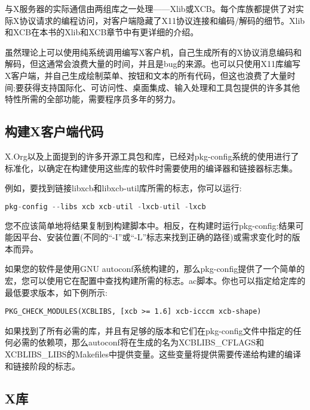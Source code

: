 与X服务器的实际通信由两组库之一处理——Xlib或XCB。每个库族都提供了对实际X协议请求的编程访问，对客户端隐藏了X11协议连接和编码/解码的细节。Xlib和XCB在本书的Xlib和XCB章节中有更详细的介绍。

虽然理论上可以使用纯系统调用编写X客户机，自己生成所有的X协议消息编码和解码，但这通常会浪费大量的时间，并且是bug的来源。也可以只使用X11库编写X客户端，并自己生成绘制菜单、按钮和文本的所有代码，但这也浪费了大量时间;要获得支持国际化、可访问性、桌面集成、输入处理和工具包提供的许多其他特性所需的全部功能，需要程序员多年的努力。

\subsection{构建X客户端代码}

X.Org以及上面提到的许多开源工具包和库，已经对pkg-config系统的使用进行了标准化，以确定在构建使用这些库的软件时需要使用的编译器和链接器标志集。

\noindent 例如，要找到链接libxcb和libxcb-util库所需的标志，你可以运行:

\begin{lstlisting}[language=C]
pkg-config --libs xcb xcb-util -lxcb-util -lxcb
\end{lstlisting}

\vspace{-2em}

您不应该简单地将结果复制到构建脚本中。相反，在构建时运行pkg-config:结果可能因平台、安装位置(不同的“-I”或“-L”标志来找到正确的路径)或需求变化时的版本而异。

\noindent 如果您的软件是使用GNU autoconf系统构建的，那么pkg-config提供了一个简单的宏，您可以使用它在配置中查找构建所需的标志。ac脚本。你也可以指定给定库的最低要求版本，如下例所示:

\begin{lstlisting}
PKG_CHECK_MODULES(XCBLIBS, [xcb >= 1.6] xcb-icccm xcb-shape)
\end{lstlisting}

\vspace{-2em}

如果找到了所有必需的库，并且有足够的版本和它们在pkg-config文件中指定的任何必需的依赖项，那么autoconf将在生成的名为XCBLIBS\_CFLAGS和XCBLIBS\_LIBS的Makefiles中提供变量。这些变量将提供需要传递给构建的编译和链接阶段的标志。

\subsection{X库}

